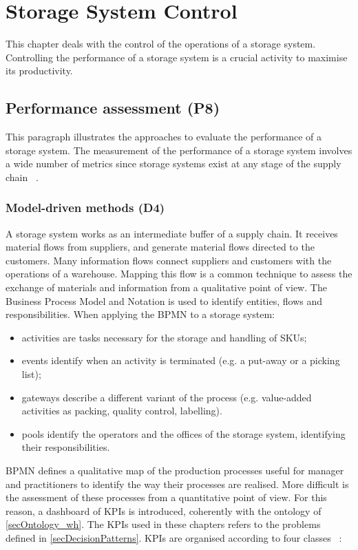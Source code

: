 \chapter{Storage System Control} \label{chapWhControl}

This chapter deals with the control of the operations of a storage system. Controlling the performance of a storage system is a crucial activity to maximise its productivity.

\section{Performance assessment (P8)}
This paragraph illustrates the approaches to evaluate the performance of a storage system. The measurement of the performance of a storage system involves a wide number of metrics since storage systems exist at any stage of the supply chain ~\cite{Accorsi2017a_wh, Malmborg2000, Manzini2007, Staudt2015}.

\subsection{Model-driven methods (D4)}

A storage system works as an intermediate buffer of a supply chain. It receives material flows from suppliers, and generate material flows directed to the customers. Many information flows connect suppliers and customers with the operations of a warehouse. Mapping this flow is a common technique to assess the exchange of materials and information from a qualitative point of view. The Business Process Model and Notation is used to identify entities, flows and responsibilities. When applying the BPMN to a storage system:

\begin{itemize}
    \item activities are tasks necessary for the storage and handling of SKUs;
    \item events identify when an activity is terminated (e.g. a put-away or a picking list);
    \item gateways describe a different variant of the process (e.g. value-added activities as packing, quality control, labelling).
    \item pools identify the operators and the offices of the storage system, identifying their responsibilities.

\end{itemize}

BPMN defines a qualitative map of the production processes useful for manager and practitioners to identify the way their processes are realised. More difficult is the assessment of these processes from a quantitative point of view. For this reason, a dashboard of KPIs is introduced, coherently with the ontology of \ref{secOntology_wh}. The KPIs used in these chapters refers to the problems defined in \ref{secDecisionPatterns}. KPIs are organised according to four classes ~\cite{Tufano2018_wh}:

